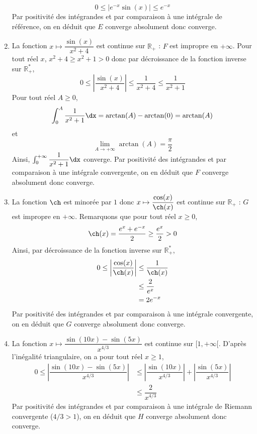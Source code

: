 \documentclass[a4paper,10pt]{report}
\begin{document}
\begin{enumerate}
$$ 0 \leq \vert  e^{-x} \sin(x)  \vert \leq e^{-x}$$
Par positivité des intégrandes et par comparaison à une intégrale de référence, on en déduit que $E$ converge absolument donc converge.
\item La fonction $x \mapsto \dfrac{\sin(x)}{x^2+4}$ est continue sur $\mathbb{R}_+$ : $F$ est impropre en $+ \infty$. Pour tout réel $x$, $x^2+4 \geq x^2+1>0$ donc par décroissance de la fonction inverse sur $\mathbb{R}_+^*$,
$$ 0 \leq \left\vert \dfrac{\sin(x)}{x^2+4} \right\vert \leq \dfrac{1}{x^2+4} \leq \dfrac{1}{x^2+1}$$
Pour tout réel $A \geq 0$,
$$ \int_0^A \dfrac{1}{x^2+1} \dx = \arctan(A)- \arctan(0)= \arctan(A)$$
et 
$$ \lim_{A \rightarrow + \infty} \arctan(A) = \dfrac{\pi}{2}$$
Ainsi, $\int_0^{+ \infty} \dfrac{1}{x^2+1} \dx$ converge. Par positivité des intégrandes et par comparaison à une intégrale convergente, on en déduit que $F$ converge absolument donc converge.
\item La fonction $\ch$ est minorée par $1$ donc $x \mapsto \dfrac{\cos(x)}{\ch(x)}$ est continue sur $\mathbb{R}_+$ : $G$ est impropre en $+ \infty$. Remarquons que pour tout réel $x \geq 0$,
$$ \ch(x) = \dfrac{e^x+e^{-x}}{2} \geq \dfrac{e^x}{2} >0$$
Ainsi, par décroissance de la fonction inverse sur $\mathbb{R}_+^*$,
\begin{align*}
0 \leq \left\vert \dfrac{\cos(x)}{\ch(x)} \right\vert & \leq \dfrac{1}{\ch(x)} \\
& \leq \dfrac{2}{e^x} \\
& = 2e^{-x}
\end{align*}
Par positivité des intégrandes et par comparaison à une intégrale convergente, on en déduit que $G$ converge absolument donc converge.
\item La fonction $x\mapsto  \dfrac{\sin(10x)-\sin(5x)}{x^{4/3}}$ est continue sur $[1, + \infty[$. D'après l'inégalité triangulaire, on a pour tout réel $x \geq 1$,
\begin{align*}
0 \leq \left\vert  \dfrac{\sin(10x)-\sin(5x)}{x^{4/3}} \right\vert & \leq \left\vert  \dfrac{\sin(10x)}{x^{4/3}} \right\vert + \left\vert  \dfrac{\sin(5x)}{x^{4/3}} \right\vert \\
& \leq \dfrac{2}{x^{4/3}}
\end{align*}
Par positivité des intégrandes et par comparaison à une intégrale de Riemann convergente ($4/3>1$), on en déduit que $H$ converge absolument donc converge.
\end{enumerate}
\end{document}
